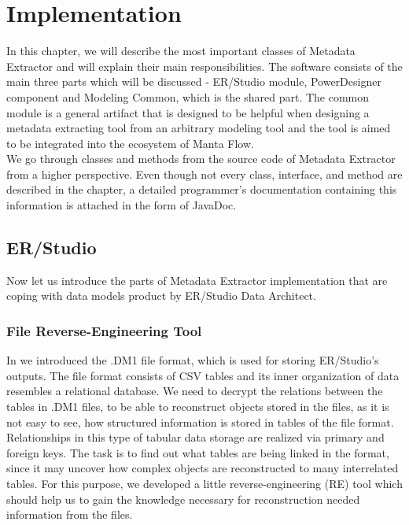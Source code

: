 \chapter{Implementation}
\label{implementation}

In this chapter, we will describe the most important classes of Metadata Extractor and will explain their main responsibilities. The software consists of the main three parts which will be discussed - ER/Studio module, PowerDesigner component and Modeling Common, which is the shared part. 
The common module is a general artifact that is designed to be helpful when designing a metadata extracting tool from an arbitrary modeling tool and the tool is aimed to be integrated into the ecosystem of Manta Flow. \\

We go through classes and methods from the source code of Metadata Extractor from a higher perspective. 
Even though not every class, interface, and method are described in the chapter, a detailed programmer's documentation containing this information is attached in the form of JavaDoc.

\section{ER/Studio}

Now let us introduce the parts of Metadata Extractor implementation that are coping with data models product by ER/Studio Data Architect.

\subsection{File Reverse-Engineering Tool}
\label{subsec:dm1_tool}

In  we introduced the .DM1 file format, which is used for storing ER/Studio's outputs.
The file format consists of CSV tables and its inner organization of data resembles a relational database.
We need to decrypt the relations between the tables in .DM1 files, to be able to reconstruct objects stored in the files, as it is not easy to see, how structured information is stored in tables of the file format.
Relationships in this type of tabular data storage are realized via primary and foreign keys.
The task is to find out what tables are being linked in the format, since it may uncover how complex objects are reconstructed to many interrelated tables.
For this purpose, we developed a little reverse-engineering (RE) tool which should help us to gain the knowledge necessary for reconstruction needed information from the files. \\

